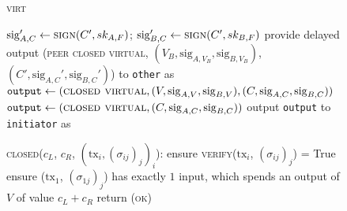 \begin{figure}[H]
\begin{processbox}{\textsc{virt}}
\begin{algorithmic}[1]
              \State $\mathrm{sig}_{A, C}' \gets \textsc{sign}(C', sk_{A, F})$;
              $\mathrm{sig}_{B, C}' \gets \textsc{sign}(C', sk_{B, F})$
            \EndIf
            \State provide delayed output (\textsc{peer closed virtual}, $(V_B,
            \mathrm{sig}_{A, V_B}, \mathrm{sig}_{B, V_B})$, $(C',
            \mathrm{sig}_{A, C}', \mathrm{sig}_{B, C}')$) to \texttt{other} as
            \bob
          \EndIf
            \State $\mathtt{output} \gets (\textsc{closed virtual}, (V,
            \mathrm{sig}_{A, V}, \mathrm{sig}_{B, V}), (C, \mathrm{sig}_{A, C},
            \mathrm{sig}_{B, C}))$
          \Else
            \State $\mathtt{output} \gets (\textsc{closed virtual}, (C,
            \mathrm{sig}_{A, C}, \mathrm{sig}_{B, C}))$
          \EndIf
          \State output \texttt{output} to \texttt{initiator} as \alice
        \EndIf
        \Statex

        \State \textsc{closed}($c_L$, $c_R$, $(\mathrm{tx}_i,
        (\sigma_{ij})_j)_i$):
        \Indent
            \State ensure \textsc{verify}($\mathrm{tx}_i$, $(\sigma_{ij})_j$) =
            True
          \EndFor
          \State ensure ($\mathrm{tx}_1$, $(\sigma_{1j})_j$) has exactly $1$
          input, which spends an output of $V$ of value $c_L + c_R$
          \State return (\textsc{ok})
        \EndIndent
    \end{algorithmic}
  \end{processbox}
  \caption{}
  \label{code:virtual-layer}
\end{figure}
